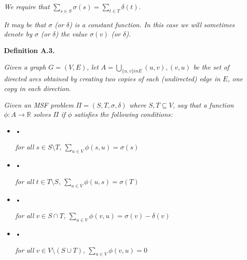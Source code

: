 \documentclass[10pt,a4paper]{article}
\begin{document}
\emph{We require that
$\sum_{s\in S}\sigma(s)=\sum_{t\in T}\delta(t)$.}\par




\emph{It may be that $\sigma$ (or $\delta$) is a constant function. In this case we will sometimes denote by $\sigma$ (or $\delta$) the value $\sigma(v)$ (or $\delta$).}\par







\par\medskip\noindent\textbf{\textbf{Definition A.3}\textbf{.}}\par



\emph{Given a graph $G=(V,E)$, let $A=\bigcup_{\{u,v\}inE}{(u,v),(v,u)}$ be the set of directed arcs obtained by creating two copies of each (undirected) edge in $E$, one copy in each direction.}\par




\emph{Given an MSF problem $\Pi=(S,T,\sigma,\delta)$ where $S,T\subseteq V$, say that a function $\phi:A\rightarrow\mathbb{R}$ solves $\Pi$ if $\phi$ satisfies the following conditions:}\par




\begin{itemize}


\item[] • 


\emph{for all }$s\in S\setminus T$\emph{, }$\sum_{u\in V}\phi(s,u)=\sigma(s)$\par




\item[] • 


\emph{for all }$t\in T\setminus S$\emph{, }$\sum_{u\in V}\phi(u,s)=\sigma(T)$\par




\item[] • 


\emph{for all }$v\in S\cap T$\emph{, }$\sum_{u\in V}\phi(v,u)=\sigma(v)-\delta(v)$\par




\item[] • 


\emph{for all }$v\in V\setminus(S\cup T)$\emph{, }$\sum_{u\in V}\phi(v,u)=0$\par




\end{itemize}
\end{document}

